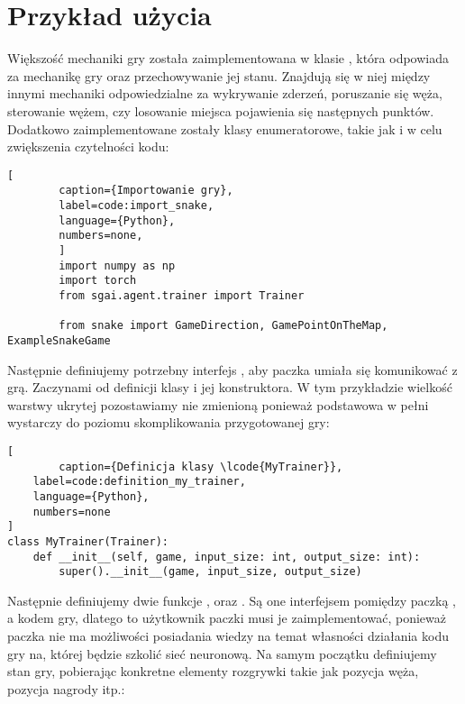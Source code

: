 \clearpage

\section{Przykład użycia}

Większość mechaniki gry została zaimplementowana w klasie , która odpowiada za mechanikę gry oraz przechowywanie jej stanu. Znajdują się w niej między innymi mechaniki odpowiedzialne za wykrywanie zderzeń, poruszanie się węża, sterowanie wężem, czy losowanie miejsca pojawienia się następnych punktów. Dodatkowo zaimplementowane zostały klasy enumeratorowe, takie jak  i  w celu zwiększenia czytelności kodu:

\begin{onepage}
    \begin{lstlisting}[
        caption={Importowanie gry},
        label=code:import_snake,
        language={Python},
        numbers=none,
        ]
        import numpy as np
        import torch
        from sgai.agent.trainer import Trainer
        
        from snake import GameDirection, GamePointOnTheMap, ExampleSnakeGame
    \end{lstlisting}
\end{onepage}



Następnie definiujemy potrzebny interfejs , aby paczka  umiała się komunikować z grą. Zaczynami od definicji klasy i jej konstruktora. W tym przykładzie wielkość warstwy ukrytej pozostawiamy nie zmienioną ponieważ podstawowa w pełni wystarczy do poziomu skomplikowania przygotowanej gry:

\begin{onepage}
    \begin{lstlisting}[
        caption={Definicja klasy \lcode{MyTrainer}},
    label=code:definition_my_trainer,
    language={Python},
    numbers=none
]
class MyTrainer(Trainer):
    def __init__(self, game, input_size: int, output_size: int):
        super().__init__(game, input_size, output_size)
    \end{lstlisting}
\end{onepage}

Następnie definiujemy dwie funkcje , oraz . Są one interfejsem pomiędzy paczką , a kodem gry, dlatego to użytkownik paczki musi je zaimplementować, ponieważ paczka nie ma możliwości posiadania wiedzy na temat własności działania kodu gry na, której będzie szkolić sieć neuronową. Na samym początku definiujemy stan gry, pobierając konkretne elementy rozgrywki takie jak pozycja węża, pozycja nagrody itp.:

